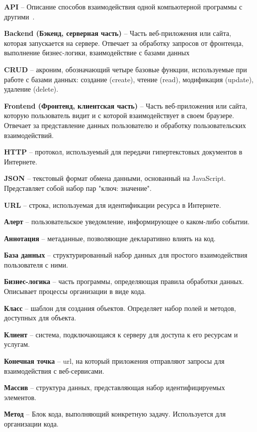 \documentclass[a4paper,article]{article}
\begin{document}
    \textbf{API} -- Описание способов взаимодействия одной компьютерной программы с другими~\cite{apiwikipedia}.

    \textbf{Backend (Бэкенд, серверная часть)} -- Часть веб-приложения или сайта, которая запускается на сервере. Отвечает за обработку запросов от фронтенда, выполнение бизнес-логики, взаимодействие с базами данных

    \textbf{CRUD} -- акроним, обозначающий четыре базовые функции, используемые при работе с базами данных: создание (create), чтение (read), модификация (update), удаление (delete).

    \textbf{Frontend (Фронтенд, клиентская часть)} -- Часть веб-приложения или сайта, которую пользователь видит и с которой взаимодействует в своем браузере. Отвечает за представление данных пользователю и обработку пользовательских взаимодействий.

    \textbf{HTTP} -- протокол, используемый для передачи гипертекстовых документов в Интернете.

    \textbf{JSON} -- текстовый формат обмена данными, основанный на JavaScript. Представляет собой набор пар "ключ: значение".

    \textbf{URL} -- строка, используемая для идентификации ресурса в Интернете.

    \textbf{Алерт} -- пользовательское уведомление, информирующее о каком-либо событии.

    \textbf{Аннотация} -- метаданные, позволяющие декларативно влиять на код.

    \textbf{База данных} -- структурированный набор данных для простого взаимодействия пользователя с ними.

    \textbf{Бизнес-логика} -- часть программы, определяющая правила обработки данных. Описывает процессы организации в виде кода.

    \textbf{Класс} -- шаблон для создания объектов. Определяет набор полей и методов, доступных для объекта.

    \textbf{Клиент} -- система, подключающаяся к серверу для доступа к его ресурсам и услугам.

    \textbf{Конечная точка} -- url, на который приложения отправляют запросы для взаимодействия с веб-сервисами.

    \textbf{Массив} -- структура данных, представляющая набор идентифицируемых элементов.

    \textbf{Метод} -- Блок кода, выполняющий конкретную задачу. Используется для организации кода.
\end{document}
